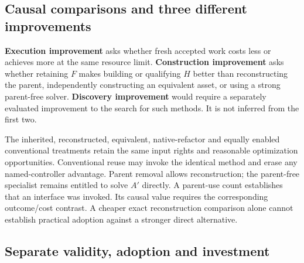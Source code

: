 \subsection{Causal comparisons and three different improvements}

\textbf{Execution improvement} asks whether fresh accepted work costs less or achieves more at the same
resource limit. \textbf{Construction improvement} asks whether retaining $F$ makes building or qualifying
$H$ better than reconstructing the parent, independently constructing an equivalent asset, or using a
strong parent-free solver. \textbf{Discovery improvement} would require a separately evaluated improvement
to the search for such methods. It is not inferred from the first two.

The inherited, reconstructed, equivalent, native-refactor and equally enabled conventional treatments retain
the same input rights and reasonable optimization opportunities. Conventional reuse may invoke the identical
method and erase any named-controller advantage. Parent removal allows reconstruction; the parent-free
specialist remains entitled to solve $A'$ directly. A parent-use count establishes that an interface was
invoked. Its causal value requires the corresponding outcome/cost contrast. A cheaper exact reconstruction
comparison alone cannot establish practical adoption against a stronger direct alternative.

\subsection{Separate validity, adoption and investment}

